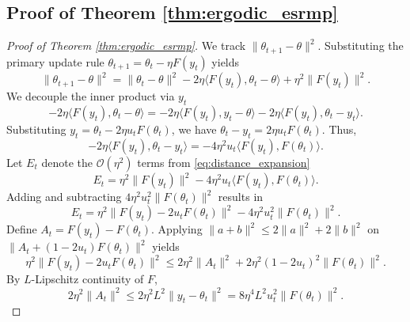 \documentclass[letter,11pt]{article}
\begin{document}
\subsection{Proof of Theorem \ref{thm:ergodic_esrmp}}\label{sec:ergodic_esrmp}
\begin{proof}[Proof of Theorem \ref{thm:ergodic_esrmp}]
We track $\|\theta_{t+1} - \theta\|^2$. Substituting the primary update rule $\theta_{t+1} = \theta_t - \eta F(y_t)$ yields
\begin{equation} \label{eq:distance_expansion}
\|\theta_{t+1} - \theta\|^2 = \|\theta_t - \theta\|^2 - 2\eta \langle F(y_t), \theta_t - \theta \rangle + \eta^2 \|F(y_t)\|^2.
\end{equation}
We decouple the inner product via $y_t$
\begin{equation} \label{eq:inner_product_split}
-2\eta \langle F(y_t), \theta_t - \theta \rangle = -2\eta \langle F(y_t), y_t - \theta \rangle - 2\eta \langle F(y_t), \theta_t - y_t \rangle.
\end{equation}
Substituting $y_t = \theta_t - 2\eta u_t F(\theta_t)$, we have $\theta_t - y_t = 2\eta u_t F(\theta_t)$. Thus,
\begin{equation} \label{eq:displacement_sub}
-2\eta \langle F(y_t), \theta_t - y_t \rangle = -4\eta^2 u_t \langle F(y_t), F(\theta_t) \rangle.
\end{equation}
Let $E_t$ denote the $\mathcal{O}(\eta^2)$ terms from \eqref{eq:distance_expansion}
\begin{equation}
E_t = \eta^2 \|F(y_t)\|^2 - 4\eta^2 u_t \langle F(y_t), F(\theta_t) \rangle.
\end{equation}
Adding and subtracting $4\eta^2 u_t^2 \|F(\theta_t)\|^2$ results in
\begin{equation} \label{eq:error_square_completion}
E_t = \eta^2 \|F(y_t) - 2u_t F(\theta_t)\|^2 - 4\eta^2 u_t^2 \|F(\theta_t)\|^2.
\end{equation}
Define $A_t = F(y_t) - F(\theta_t)$. Applying $\|a + b\|^2 \le 2\|a\|^2 + 2\|b\|^2$ on $\|A_t + (1-2u_t)F(\theta_t)\|^2$ yields
\begin{equation} \label{eq:error_geometric_bound}
\eta^2 \|F(y_t) - 2u_t F(\theta_t)\|^2 \le 2\eta^2 \|A_t\|^2 + 2\eta^2 (1-2u_t)^2 \|F(\theta_t)\|^2.
\end{equation}
By $L$-Lipschitz continuity of $F$,
\begin{equation} \label{eq:lipschitz_application}
2\eta^2 \|A_t\|^2 \le 2\eta^2 L^2 \|y_t - \theta_t\|^2 = 8\eta^4 L^2 u_t^2 \|F(\theta_t)\|^2.
\end{equation}

\end{proof}
\end{document}
